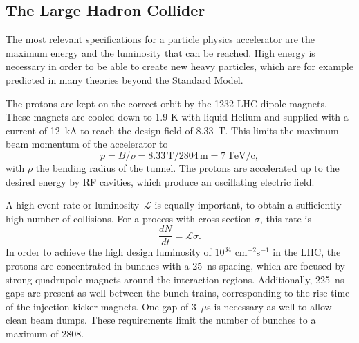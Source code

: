 \subsection{The Large Hadron Collider}

The most relevant specifications for a particle physics accelerator are the maximum energy and the luminosity that can be reached. High energy is necessary in order to be able to create new heavy particles, which are for example predicted in many theories beyond the Standard Model.

The protons are kept on the correct orbit by the 1232 \ac{LHC} dipole magnets. These magnets are cooled down to 1.9 K with liquid Helium and supplied with a current of 12~kA to reach the design field of 8.33~T. This limits the maximum beam momentum of the accelerator to 
\begin{equation}
 p = B/\rho = 8.33\, \mathrm{T}/2804\,\mathrm{m}=7\,\mathrm{TeV/c},
\end{equation}
with $\rho$ the bending radius of the tunnel. The protons are accelerated up to the desired energy by \ac{RF} cavities, which produce an oscillating electric field. 

A high event rate or luminosity~$\mathcal{L}$ is equally important, to obtain a sufficiently high number of collisions. For a process with cross section $\sigma$, this rate is 
\begin{equation}
 \frac{dN}{dt} = \mathcal{L}\sigma .
\end{equation}
In order to achieve the high design luminosity of $10^{34}$ cm$^{-2}$s$^{-1}$ in the \ac{LHC}, the protons are concentrated in bunches with a \SI{25}{ns} spacing, which are focused by strong quadrupole magnets around the interaction regions. Additionally, 2\SI{25}{ns} gaps are present as well between the bunch trains, corresponding to the rise time of the injection kicker magnets. One gap of 3~$\mu$s is necessary as well to allow clean beam dumps. These requirements limit the number of bunches to a maximum of 2808.


